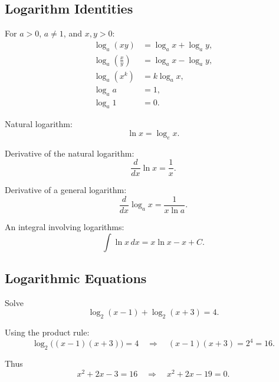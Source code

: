 \documentclass[12pt,a4paper]{article}
\begin{document}
\subsection{Logarithm Identities}

For $a > 0$, $a \neq 1$, and $x,y > 0$:
\begin{align}
  \log_a (xy)                     & = \log_a x + \log_a y, \\
  \log_a \left(\frac{x}{y}\right) & = \log_a x - \log_a y, \\
  \log_a (x^k)                    & = k \log_a x,          \\
  \log_a a                        & = 1,                   \\
  \log_a 1                        & = 0.
\end{align}

Natural logarithm:
\begin{equation}
  \ln x = \log_e x.
\end{equation}

Derivative of the natural logarithm:
\begin{equation}
  \frac{d}{dx} \ln x = \frac{1}{x}.
\end{equation}

Derivative of a general logarithm:
\begin{equation}
  \frac{d}{dx} \log_a x = \frac{1}{x \ln a}.
\end{equation}

An integral involving logarithms:
\begin{equation}
  \int \ln x\,dx = x \ln x - x + C.
\end{equation}

\subsection{Logarithmic Equations}

Solve
\begin{equation}
  \log_2 (x - 1) + \log_2 (x + 3) = 4.
\end{equation}

Using the product rule:
\begin{equation}
  \log_2 \big((x - 1)(x + 3)\big) = 4
  \quad \Longrightarrow \quad
  (x - 1)(x + 3) = 2^4 = 16.
\end{equation}

Thus
\begin{equation}
  x^2 + 2x - 3 = 16
  \quad \Longrightarrow \quad
  x^2 + 2x - 19 = 0.
\end{equation}
\end{document}
